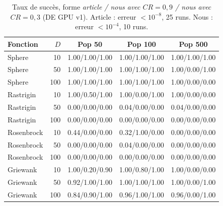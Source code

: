 \begin{table}[!t]\centering\scriptsize\setlength{\tabcolsep}{2pt}\caption{Taux de succ\`es, forme \emph{article / nous avec $CR{=}0{,}9$ / nous avec $CR{=}0{,}3$} (DE GPU v1). Article \cite{qin} : erreur $<10^{-8}$, 25 runs. Nous : erreur $<10^{-4}$, 10 runs.}\label{tab:sr}
\begin{tabular}{lr|ccc}\toprule Fonction & $D$ & Pop 50 & Pop 100 & Pop 500\\\midrule
Sphere & 10 & 1.00/1.00/1.00 & 1.00/1.00/1.00 & 1.00/1.00/1.00\\
Sphere & 50 & 1.00/1.00/1.00 & 1.00/1.00/1.00 & 1.00/0.00/1.00\\
Sphere & 100 & 1.00/1.00/1.00 & 1.00/1.00/1.00 & 1.00/0.00/0.00\\
Rastrigin & 10 & 1.00/0.50/1.00 & 1.00/0.00/1.00 & 1.00/0.00/0.00\\
Rastrigin & 50 & 0.00/0.00/0.00 & 0.04/0.00/0.00 & 0.04/0.00/0.00\\
Rastrigin & 100 & 0.00/0.00/0.00 & 0.00/0.00/0.00 & 0.00/0.00/0.00\\
Rosenbrock & 10 & 0.44/0.00/0.00 & 0.32/1.00/0.00 & 0.00/0.00/0.00\\
Rosenbrock & 50 & 0.00/0.00/0.00 & 0.04/0.00/0.00 & 0.00/0.00/0.00\\
Rosenbrock & 100 & 0.00/0.00/0.00 & 0.00/0.00/0.00 & 0.00/0.00/0.00\\
Griewank & 10 & 1.00/0.20/0.90 & 1.00/0.80/1.00 & 1.00/0.00/0.00\\
Griewank & 50 & 0.92/1.00/1.00 & 1.00/1.00/1.00 & 1.00/0.00/1.00\\
Griewank & 100 & 0.84/0.90/1.00 & 0.96/1.00/1.00 & 0.96/0.00/1.00\\
\bottomrule\end{tabular}\end{table}

